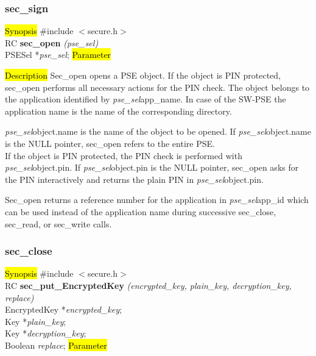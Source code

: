 \subsubsection{sec\_sign}
\label{sec_open}
\hl{Synopsis}
\#include $<$secure.h$>$ \\ [0.5cm]
RC {\bf sec\_open} {\em (pse\_sel)} \\
PSESel *{\em pse\_sel};
\hl{Parameter}

\hl{Description}
Sec\_open opens a PSE object. If the object is PIN protected, sec\_open performs
all necessary actions for the PIN check.
The object belongs to the application identified by {\em pse\_sel}\pf app\_name.
In case of the SW-PSE the application name is the name of the corresponding directory. 

{\em pse\_sel}\pf object.name is the name of the object to be opened. If {\em pse\_sel}\pf object.name
is the NULL pointer, sec\_open refers to the entire PSE. \\
If the object is PIN protected, the PIN check is performed with {\em pse\_sel}\pf object.pin.
If {\em pse\_sel}\pf object.pin is the NULL pointer, sec\_open asks for the PIN
interactively and returns the plain PIN in {\em pse\_sel}\pf object.pin. 

Sec\_open returns a reference number for the application in {\em pse\_sel}\pf app\_id which
can be used instead of the application name during successive sec\_close, sec\_read, 
or sec\_write calls.

\subsubsection{sec\_close}
\label{sec_put_decr_key}
\hl{Synopsis}
\#include $<$secure.h$>$ \\ [0.5cm]
RC {\bf sec\_put\_EncryptedKey} {\em (encrypted\_key, plain\_key, decryption\_key, replace)} \\
EncryptedKey *{\em encrypted\_key}; \\
Key *{\em plain\_key}; \\
Key *{\em decryption\_key}; \\
Boolean {\em replace};
\hl{Parameter}


